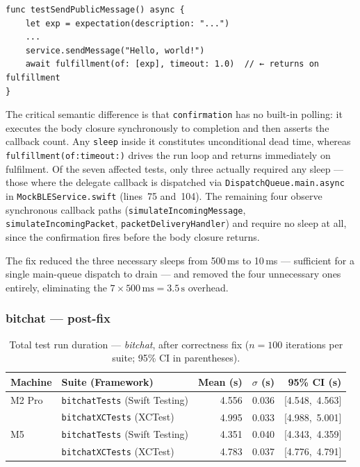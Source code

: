\begin{verbatim}
func testSendPublicMessage() async {
    let exp = expectation(description: "...")
    ...
    service.sendMessage("Hello, world!")
    await fulfillment(of: [exp], timeout: 1.0)  // ← returns on fulfillment
}
\end{verbatim}

The critical semantic difference is that \texttt{confirmation} has no built-in
polling: it executes the body closure synchronously to completion and then asserts
the callback count. Any \texttt{sleep} inside it constitutes unconditional dead time,
whereas \texttt{fulfillment(of:timeout:)} drives the run loop and returns
immediately on fulfilment. Of the seven affected tests, only three actually required
any sleep --- those where the delegate callback is dispatched via
\texttt{DispatchQueue.main.async} in \texttt{MockBLEService.swift} (lines~75 and~104).
The remaining four observe synchronous callback paths
(\texttt{simulateIncomingMessage}, \texttt{simulateIncomingPacket},
\texttt{packetDeliveryHandler}) and require no sleep at all, since the confirmation
fires before the body closure returns.

The fix reduced the three necessary sleeps from 500\,ms to 10\,ms --- sufficient for
a single main-queue dispatch to drain --- and removed the four unnecessary ones
entirely, eliminating the $7 \times 500\,\mathrm{ms} = 3.5\,\mathrm{s}$ overhead.

\subsubsection*{bitchat --- post-fix}

\begin{table}[ht]
    \centering
    \caption{%
        Total test run duration --- \textit{bitchat}, after correctness fix
        ($n = 100$ iterations per suite; 95\% CI in parentheses).%
    }
    \label{tab:perf-bitchat-post}
    \begin{tabular}{llrrr}
        \toprule
        \textbf{Machine} & \textbf{Suite (Framework)} &
        \textbf{Mean (s)} & \textbf{$\sigma$ (s)} & \textbf{95\% CI (s)} \\
        \midrule
        M2 Pro & \texttt{bitchatTests} (Swift Testing)  & 4.556 & 0.036 & [4.548,\ 4.563] \\
               & \texttt{bitchatXCTests} (XCTest)        & 4.995 & 0.033 & [4.988,\ 5.001] \\
        \midrule
        M5     & \texttt{bitchatTests} (Swift Testing)  & 4.351 & 0.040 & [4.343,\ 4.359] \\
               & \texttt{bitchatXCTests} (XCTest)        & 4.783 & 0.037 & [4.776,\ 4.791] \\
        \bottomrule
    \end{tabular}
\end{table}

